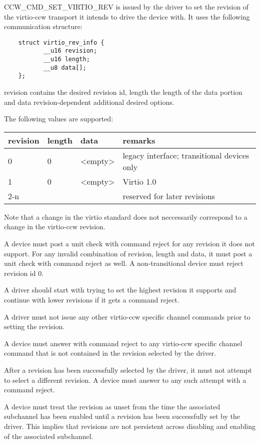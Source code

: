 CCW_CMD_SET_VIRTIO_REV is issued by the driver to set the revision of
the virtio-ccw transport it intends to drive the device with. It uses the
following communication structure:

\begin{lstlisting}
	struct virtio_rev_info {
	       __u16 revision;
	       __u16 length;
	       __u8 data[];
	};
\end{lstlisting}

revision contains the desired revision id, length the length of the
data portion and data revision-dependent additional desired options.

The following values are supported:

\begin{tabular}{ |l|l|l|l| }
\hline
revision & length & data      & remarks \\
\hline \hline
0        & 0      & <empty>   & legacy interface; transitional devices only \\
\hline
1        & 0      & <empty>   & Virtio 1.0 \\
\hline
2-n      &        &           & reserved for later revisions \\
\hline
\end{tabular}

Note that a change in the virtio standard does not neccessarily
correspond to a change in the virtio-ccw revision.

A device must post a unit check with command reject for any revision
it does not support. For any invalid combination of revision, length
and data, it must post a unit check with command reject as well. A
non-transitional device must reject revision id 0.

A driver should start with trying to set the highest revision it
supports and continue with lower revisions if it gets a command reject.

A driver must not issue any other virtio-ccw specific channel commands
prior to setting the revision.

A device must answer with command reject to any virtio-ccw specific
channel command that is not contained in the revision selected by the
driver.

After a revision has been successfully selected by the driver, it
must not attempt to select a different revision. A device must answer
to any such attempt with a command reject.

A device must treat the revision as unset from the time the associated
subchannel has been enabled until a revision has been successfully set
by the driver. This implies that revisions are not persistent across
disabling and enabling of the associated subchannel.

